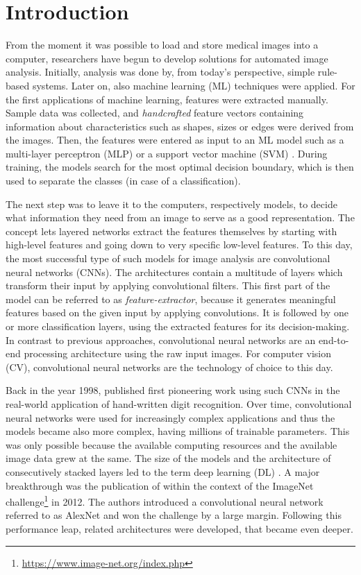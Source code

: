 \section{Introduction}
\label{sec:Introduction}

From the moment it was possible to load and store medical images into a computer, researchers have begun to develop solutions for automated image analysis.
Initially, analysis was done by, from today's perspective, simple rule-based systems.
Later on, also machine learning (ML) techniques were applied. For the first applications of machine learning, features were extracted manually. Sample data was collected, and \textit{handcrafted} feature vectors containing information about characteristics such as shapes, sizes or edges were derived from the images. 
Then, the features were entered as input to an ML model such as a multi-layer perceptron (MLP) \citep{Rumelhart1986LearningErrors} or a support vector machine (SVM) \citep{Vapnik1995TheTheory}. During training, the models search for the most optimal decision boundary, which is then used to separate the classes (in case of a classification).

The next step was to leave it to the computers, respectively models, to decide what information they need from an image to serve as a good representation. The concept lets layered networks extract the features themselves by starting with high-level features and going down to very specific low-level features. To this day, the most successful type of such models for image analysis are convolutional neural networks (CNNs). The architectures contain a multitude of layers which transform their input by applying convolutional filters. This first part of the model can be referred to as \textit{feature-extractor}, because it generates meaningful features based on the given input by applying convolutions. It is followed by one or more classification layers, using the extracted features for its decision-making. In contrast to previous approaches, convolutional neural networks are an end-to-end processing architecture using the raw input images. For computer vision (CV), convolutional neural networks are the technology of choice to this day.

Back in the year 1998, \cite{LeCun1998Gradient-basedRecognition} published first pioneering work using such CNNs in the real-world application of hand-written digit recognition.
Over time, convolutional neural networks were used for increasingly complex applications and thus the models became also more complex, having millions of trainable parameters.
This was only possible because the available computing resources and the available image data grew at the same.
The size of the models and the architecture of consecutively stacked layers led to the term deep learning (DL) \citep{Lecun2015DeepLearning}.
A major breakthrough was the publication of \cite{NIPS2012_c399862d} within the context of the ImageNet challenge\footnote{\url{https://www.image-net.org/index.php}} in 2012. The authors introduced a convolutional neural network referred to as AlexNet and won the challenge by a large margin.
Following this performance leap, related architectures were developed, that became even deeper.

